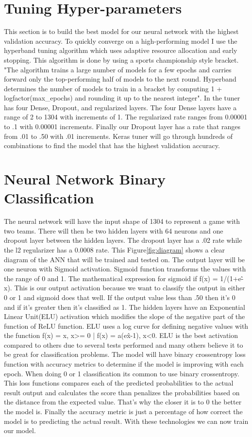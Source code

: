\documentclass[12pt]{IEEEtran}
\begin{document}
\section{Tuning Hyper-parameters}
This section is to build the best model for our neural network with the highest validation accuracy. To quickly converge on a high-performing model I use the hyperband tuning algorithm which uses adaptive resource allocation and early stopping. This algorithm is done by using a sports championship style bracket. "The algorithm trains a large number of models for a few epochs and carries forward only the top-performing half of models to the next round. Hyperband determines the number of models to train in a bracket by computing 1 + logfactor(max\_epochs) and rounding it up to the nearest integer"\cite{tensorflow2015-whitepaper}. In the tuner has four Dense, Dropout, and regularized layers. The four Dense layers have a range of 2 to 1304 with increments of 1. The regularized rate ranges from 0.00001 to .1 with 0.00001 increments. Finally our Dropout layer has a rate that ranges from .01 to .50 with .01 increments. Keras tuner will go through hundreds of combinations to find the model that has the highest validation accuracy.

\section{Neural Network Binary Classification}
The neural network will have the input shape of 1304 to represent a game with two teams. There will then be two hidden layers with 64 neurons and one dropout layer between the hidden layers. The dropout layer has a .02 rate while the l2 regularizer has a 0.0008 rate. This Figure\ref{fig:diagram} shows a clear diagram of the ANN that will be trained and tested on. The output layer will be one neuron with Sigmoid activation. Sigmoid function transforms the values with the range of 0 and 1. The mathematical expression for sigmoid if f(x) = 1/(1+e\^-x). This is our output activation because we want to classify the output in either 0 or 1 and sigmoid does that well. If the output value less than .50 then it's 0 and if it's greater then it's classified as 1. The hidden layers have an Exponential Linear Unit(ELU) activation which modifies the slope of the negative part of the function of ReLU function. ELU uses a log curve for defining negative values with the function f(x) = x, x>= 0 | f(x) = a(e\^x-1), x<0. ELU is the best activation compared to others due to several tests performed and many others believe it to be great for classification problems. The model will have binary crossentropy loss function with accuracy metrics to determine if the model is improving with each epoch. When doing 0 or 1 classification its common to use binary crossentropy. This loss functions compares each of the predicted probabilities to the actual result output and calculates the score than penalizes the probabilities based on the distance from the expected value. That's why the closer it is to 0 the better the model is. Finally the accuracy metric is just a percentage of how correct the model is to predicting the actual result. With these technologies we can now train our model. 
\end{document}
